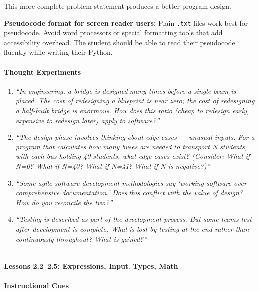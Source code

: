 \documentclass[
  justified,
  openright,
]{tufte-book}
\let\subsection\paragraph
\let\paragraph\paragraph
\let\subsection\paragraph
\let\paragraph\paragraph
\begin{document}
This more complete problem statement produces a better program design.

\textbf{Pseudocode format for screen reader users:} Plain \texttt{.txt}
files work best for pseudocode. Avoid word processors or special
formatting tools that add accessibility overhead. The student should be
able to read their pseudocode fluently while writing their Python.

\paragraph{Thought Experiments}\label{thought-experiments-7}

\begin{enumerate}
\def\labelenumi{\arabic{enumi}.}
\item
  \emph{``In engineering, a bridge is designed many times before a
  single beam is placed. The cost of redesigning a blueprint is near
  zero; the cost of redesigning a half-built bridge is enormous. How
  does this ratio (cheap to redesign early, expensive to redesign later)
  apply to software?''}
\item
  \emph{``The design phase involves thinking about edge cases ---
  unusual inputs. For a program that calculates how many buses are
  needed to transport N students, with each bus holding 40 students,
  what edge cases exist? (Consider: What if N=0? What if N=40? What if
  N=41? What if N is negative?)''}
\item
  \emph{``Some agile software development methodologies say `working
  software over comprehensive documentation.' Does this conflict with
  the value of design? How do you reconcile the two?''}
\item
  \emph{``Testing is described as part of the development process. But
  some teams test after development is complete. What is lost by testing
  at the end rather than continuously throughout? What is gained?''}
\end{enumerate}

\begin{center}\rule{0.5\linewidth}{0.5pt}\end{center}

\subsection{Lessons 2.2--2.5: Expressions, Input, Types,
Math}\label{lessons-2.22.5-expressions-input-types-math}

\paragraph{Instructional Cues}\label{instructional-cues-6}
\end{document}
